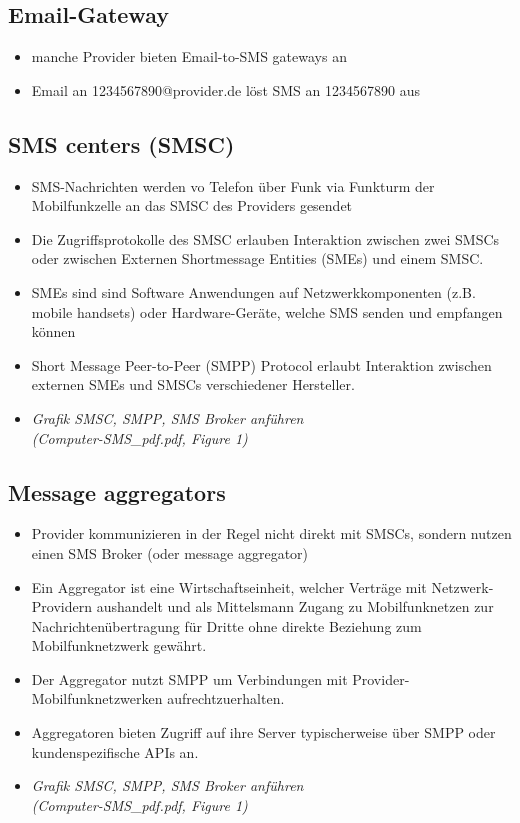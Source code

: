\documentclass[german,12pt,a4paper]{article}
\begin{document}
\subsection{Email-Gateway}
\begin{itemize}
	\item manche Provider bieten Email-to-SMS gateways an
	\item Email an 1234567890@provider.de löst SMS an 1234567890 aus
\end{itemize}

\subsection{SMS centers (SMSC)}
\begin{itemize}
	\item SMS-Nachrichten werden vo Telefon über Funk via Funkturm der Mobilfunkzelle an das SMSC des Providers 
		gesendet
	\item Die Zugriffsprotokolle des SMSC erlauben Interaktion zwischen zwei SMSCs oder zwischen Externen Shortmessage 
		Entities (SMEs) und einem SMSC.
	\item SMEs sind sind Software Anwendungen auf Netzwerkkomponenten (z.B. mobile handsets) oder Hardware-Geräte, welche 
		SMS senden und empfangen können
	\item Short Message Peer-to-Peer (SMPP) Protocol erlaubt Interaktion zwischen externen SMEs und SMSCs 
		verschiedener Hersteller.
	\item \textit{Grafik SMSC, SMPP, SMS Broker anführen \\(Computer-SMS\_pdf.pdf, Figure 1)}
\end{itemize}

\subsection{Message aggregators}
\begin{itemize}
	\item Provider kommunizieren in der Regel nicht direkt mit SMSCs, sondern nutzen einen SMS Broker (oder message aggregator)
	\item Ein Aggregator ist eine Wirtschaftseinheit, welcher Verträge mit Netzwerk-Providern aushandelt und als Mittelsmann
		Zugang zu Mobilfunknetzen zur Nachrichtenübertragung für Dritte ohne direkte Beziehung zum Mobilfunknetzwerk gewährt. 
	\item Der Aggregator nutzt SMPP um Verbindungen mit Provider-Mobilfunknetzwerken aufrechtzuerhalten.
	\item Aggregatoren bieten Zugriff auf ihre Server typischerweise über SMPP oder kundenspezifische APIs an.
	\item \textit{Grafik SMSC, SMPP, SMS Broker anführen \\(Computer-SMS\_pdf.pdf, Figure 1)}
\end{itemize}
\end{document}
